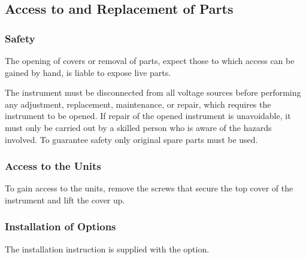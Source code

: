 \subsection{Access to and Replacement of Parts}
\subsubsection{Safety}
The opening of covers or removal of parts, expect those to which access can be gained by hand, is liable to expose live parts.

The instrument must be disconnected from all voltage sources before performing any adjustment, replacement, maintenance, or repair, which requires the instrument to be opened. If repair of the opened instrument is unavoidable, it must only be carried out by a skilled person who is aware of the hazards involved. To guarantee safety only original spare parts must be used.

\subsubsection{Access to the Units}
To gain access to the units, remove the screws that secure the top cover of the instrument and lift the cover up.

\subsubsection{Installation of Options}
The installation instruction is supplied with the option.